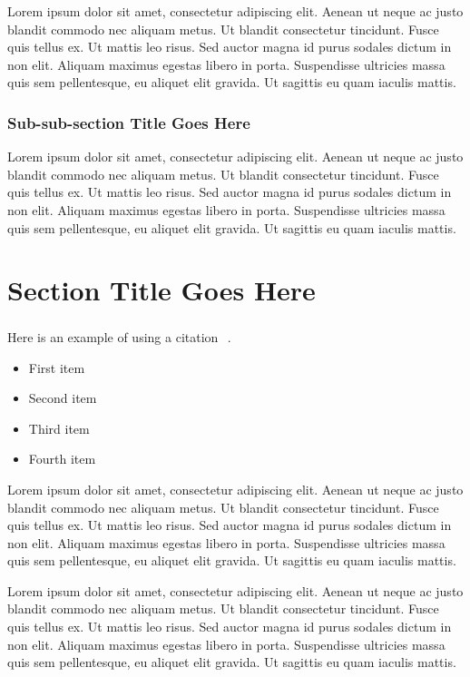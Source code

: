 \documentclass{csmagazine}
\begin{document}
Lorem ipsum dolor sit amet, consectetur adipiscing elit. Aenean ut neque ac justo blandit commodo nec aliquam metus. Ut blandit consectetur tincidunt. Fusce quis tellus ex. Ut mattis leo risus. Sed auctor magna id purus sodales dictum in non elit. Aliquam maximus egestas libero in porta. Suspendisse ultricies massa quis sem pellentesque, eu aliquet elit gravida. Ut sagittis eu quam iaculis mattis.

\subsubsection*{Sub-sub-section Title Goes Here}

Lorem ipsum dolor sit amet, consectetur adipiscing elit. Aenean ut neque ac justo blandit commodo nec aliquam metus. Ut blandit consectetur tincidunt. Fusce quis tellus ex. Ut mattis leo risus. Sed auctor magna id purus sodales dictum in non elit. Aliquam maximus egestas libero in porta. Suspendisse ultricies massa quis sem pellentesque, eu aliquet elit gravida. Ut sagittis eu quam iaculis mattis.

\section*{Section Title Goes Here}

Here is an example of using a citation \textsuperscript{~\cite{Niu:2018ejh}}.


\begin{itemize}
	\item First item
	\item Second item
	\item Third item
	\item Fourth item
\end{itemize}

Lorem ipsum dolor sit amet, consectetur adipiscing elit. Aenean ut neque ac justo blandit commodo nec aliquam metus. Ut blandit consectetur tincidunt. Fusce quis tellus ex. Ut mattis leo risus. Sed auctor magna id purus sodales dictum in non elit. Aliquam maximus egestas libero in porta. Suspendisse ultricies massa quis sem pellentesque, eu aliquet elit gravida. Ut sagittis eu quam iaculis mattis.

Lorem ipsum dolor sit amet, consectetur adipiscing elit. Aenean ut neque ac justo blandit commodo nec aliquam metus. Ut blandit consectetur tincidunt. Fusce quis tellus ex. Ut mattis leo risus. Sed auctor magna id purus sodales dictum in non elit. Aliquam maximus egestas libero in porta. Suspendisse ultricies massa quis sem pellentesque, eu aliquet elit gravida. Ut sagittis eu quam iaculis mattis.
\end{document}
